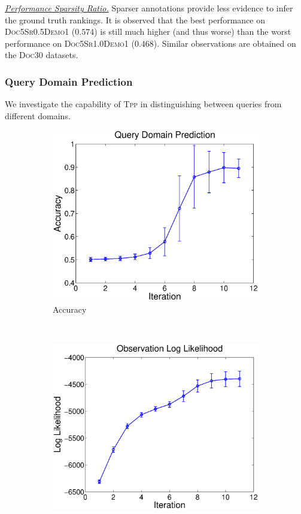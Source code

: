 \noindent\underline{\emph{Performance \wrt{} Sparsity Ratio.}} Sparser
annotations provide less evidence to infer the ground truth rankings.  It is
observed that the best performance on \textsc{Doc5Sr0.5Demo1}  ($0.574$) is
still much higher (and thus worse) than the worst performance on
\textsc{Doc5Sr1.0Demo1} ($0.468$).  Similar observations are obtained on the
\textsc{Doc30} datasets.

\subsubsection{Query Domain Prediction}

We investigate the  capability of \textsc{Tpp} in distinguishing between queries
from different domains.

\begin{figure}[h!]
	\centering
		\begin{subfigure}[b]{.5\linewidth}
      \includegraphics[width=1\textwidth]{crowd-thurstonian/figure/dp_acc.eps}
      \caption{Accuracy} \label{fig::dp_acc}
		\end{subfigure}
    ~
		\begin{subfigure}[b]{.5\linewidth}
      \includegraphics[width=1\textwidth]{crowd-thurstonian/figure/dp_loglikeli.eps}

\end{subfigure}
\end{figure}
